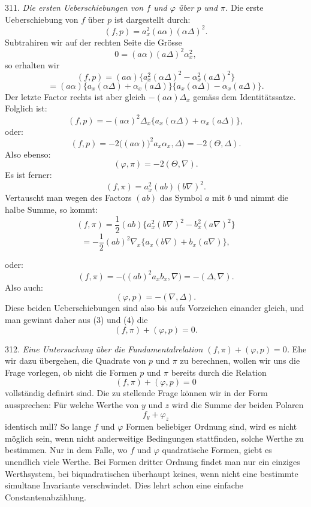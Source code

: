 \documentclass[11pt]{article}
\providecommand{\gesperrt}[1]{\textls[130]{#1}}
\providecommand{\weberpage}[1]{}
\providecommand{\weq}[2]{\begin{equation}\tag{#1}#2\end{equation}}
\let\Delta\varDelta
\let\Theta\varTheta
\begin{document}
311. \textit{Die ersten Ueberschiebungen von $f$ und $\varphi$ über $p$
und $\pi$.} Die erste Ueberschiebung von $f$ über $p$ ist dargestellt
durch:
\[
(f, p) = a_x^2(a\alpha)(\alpha\Delta)^2.
\]
Subtrahiren wir auf der rechten Seite die Grösse
\[
0 = (a\alpha)(a\Delta)^2\alpha_x^2,
\]
so erhalten wir
\[
(f, p) = (a\alpha)\{a_x^2(\alpha\Delta)^2 - \alpha_x^2(a\Delta)^2\}
\]
\[
= (a\alpha)\{a_x(\alpha\Delta) + \alpha_x(a\Delta)\}\{a_x(\alpha\Delta) - \alpha_x(a\Delta)\}.
\]
Der letzte Factor rechts ist aber gleich $-(a\alpha)\Delta_x$ gemäss dem
Identitätssatze. Folglich ist:
\[
(f, p) = -(a\alpha)^2\Delta_x\{a_x(\alpha\Delta) + \alpha_x(a\Delta)\},
\]
oder:
\weq{1}{(f, p) = -2\big((a\alpha)\big)^2a_x\alpha_x, \Delta\big) = -2(\Theta, \Delta).}
Also ebenso:
\weq{2}{(\varphi, \pi) = -2(\Theta, \nabla).}
Es ist ferner:
\[
(f, \pi) = a_x^2(ab)(b\nabla)^2.
\]
Vertauscht man wegen des Factors $(ab)$ das Symbol $a$ mit $b$ und
nimmt die halbe Summe, so kommt:
\[
(f, \pi) = \frac{1}{2}(ab)\{a_x^2(b\nabla)^2 - b_x^2(a\nabla)^2\}
\]
\[
= -\frac{1}{2}(ab)^2\nabla_x\{a_x(b\nabla) + b_x(a\nabla)\},
\]


\weberpage{335}
oder:
\weq{3}{(f, \pi) = -\big((ab)^2a_xb_x, \nabla\big) = -(\Delta, \nabla).}
Also auch:
\weq{4}{(\varphi, p) = -(\nabla, \Delta).}
Diese beiden Ueberschiebungen sind also bis aufs Vorzeichen einander
gleich, und man gewinnt daher aus (3) und (4) die
\gesperrt{Fundamentalrelation:}
\weq{5}{(f, \pi) + (\varphi, p) = 0.}

312. \textit{Eine Untersuchung über die Fundamentalrelation
$(f, \pi)+(\varphi, p)=0$.} Ehe wir dazu übergehen, die Quadrate von $p$
und $\pi$ zu berechnen, wollen wir uns die Frage vorlegen, ob nicht die
Formen $p$ und $\pi$ bereits durch die Relation
\weq{1}{(f, \pi) + (\varphi, p) = 0}
vollständig definirt sind. Die zu stellende Frage können wir in der
Form aussprechen: Für welche Werthe von $y$ und $z$ wird die Summe der
beiden Polaren
\[
f_y + \varphi_z
\]
identisch null? So lange $f$ und $\varphi$ Formen beliebiger Ordnung
sind, wird es nicht möglich sein, wenn nicht anderweitige Bedingungen
stattfinden, solche Werthe zu bestimmen. Nur in dem Falle, wo $f$ und
$\varphi$ quadratische Formen, giebt es unendlich viele Werthe. Bei
Formen dritter Ordnung findet man nur ein einziges Werthsystem, bei
biquadratischen überhaupt keines, wenn nicht eine bestimmte simultane
Invariante verschwindet. Dies lehrt schon eine einfache
Constantenabzählung.
\end{document}
